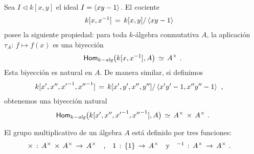 Sea $I\triangleleft k[x,y]$ el ideal $I=\left\langle{xy-1}\right\rangle_{}$. El cociente
\begin{align*}
	k[x,x^{-1}] & \,=\,k[x,y]/\left\langle{xy-1}\right\rangle_{}
\end{align*}
%
posee la siguiente propiedad: para toda $k$-\'{a}lgebra conmutativa $A$,
la aplicaci\'{o}n $\tau_A:\,f\mapsto f(x)$ es una biyecci\'{o}n
\begin{equation}
	\label{eq:polinomiosdelaurent}
	\mathsf{Hom}_{k-\mathit{alg}}\big(k[x,x^{-1}],A\big) \,\simeq\,A^\times
	\text{ .}
\end{equation}
%
Esta biyecci\'{o}n es natural en $A$. De manera similar, si definimos
\begin{align*}
	k[x',x'',{x'}^{-1},{x''}^{-1}] & \,=\,k[x',y',x'',y'']/
		\left\langle{x'y'-1,x''y''-1}\right\rangle_{}
	\text{ ,}
\end{align*}
%
obtenemos una biyecci\'{o}n natural
\begin{equation}
	\label{eq:polinomiosdelaurentproducto}
	\mathsf{Hom}_{k-\mathit{alg}}\big(k[x',x'',{x'}^{-1},{x''}^{-1}],A\big) \,\simeq\,
		A^\times\,\times\,A^\times
	\text{ .}
\end{equation}
%

El grupo multiplicativo de un \'{a}lgebra $A$ est\'{a} definido por tres
funciones:
\begin{align*}
	\times\,:\,A^\times\,\times\,A^\times\,\rightarrow\,A^\times
		& \quad\text{,}\quad
	1\,:\,\{1\}\,\rightarrow\,A^\times
		\quad\text{y}\quad
	\null^{-1}\,:\,A^\times\,\rightarrow\,A^\times
	\text{ .}
\end{align*}
%

